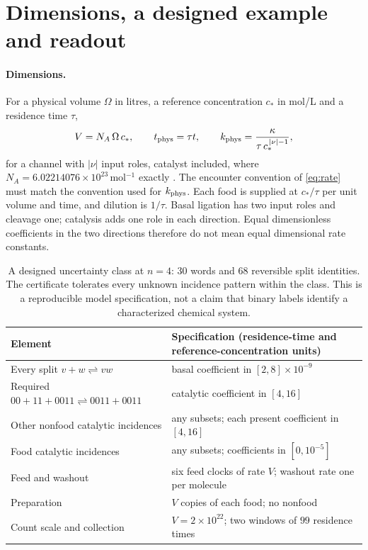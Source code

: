 \documentclass[11pt,letterpaper]{article}
\theoremstyle{plain}
\theoremstyle{definition}
\theoremstyle{remark}
\numberwithin{equation}{section}
\begin{document}
\section{Dimensions, a designed example and readout}\label{sec:units}

\paragraph{Dimensions.}
For a physical volume $\Omega$ in litres, a reference concentration $c_*$ in mol/L and a residence time $\tau$,
\begin{equation}\label{eq:units}
 V=N_A\,\Omega\,c_*,\qquad t_{\rm phys}=\tau t,\qquad k_{\rm phys}=\frac{\kappa}{\tau\,c_*^{\,|\nu|-1}},
\end{equation}
for a channel with $|\nu|$ input roles, catalyst included, where $N_A=6.02214076\times10^{23}$\,mol$^{-1}$ exactly \cite{bipm2019si}. The encounter convention of \eqref{eq:rate} must match the convention used for $k_{\rm phys}$. Each food is supplied at $c_*/\tau$ per unit volume and time, and dilution is $1/\tau$. Basal ligation has two input roles and cleavage one; catalysis adds one role in each direction. Equal dimensionless coefficients in the two directions therefore do not mean equal dimensional rate constants.

\begin{table}[t]
\centering\small
\begin{tabular}{@{}>{\raggedright\arraybackslash}p{.4\linewidth}>{\raggedright\arraybackslash}p{.52\linewidth}@{}}
\toprule
Element & Specification (residence-time and reference-concentration units)\\
\midrule
Every split $v+w\rightleftharpoons vw$ & basal coefficient in $[2,8]\times10^{-9}$\\
Required $00+11+0011\rightleftharpoons0011+0011$ & catalytic coefficient in $[4,16]$\\
Other nonfood catalytic incidences & any subsets; each present coefficient in $[4,16]$\\
Food catalytic incidences & any subsets; coefficients in $[0,10^{-5}]$\\
Feed and washout & six feed clocks of rate $V$; washout rate one per molecule\\
Preparation & $V$ copies of each food; no nonfood\\
Count scale and collection & $V=2\times10^{22}$; two windows of $99$ residence times\\
\bottomrule
\end{tabular}
\caption{A designed uncertainty class at $n=4$: $30$ words and $68$ reversible split identities. The certificate tolerates every unknown incidence pattern within the class. This is a reproducible model specification, not a claim that binary labels identify a characterized chemical system.}
\label{tab:design}
\end{table}
\end{document}
